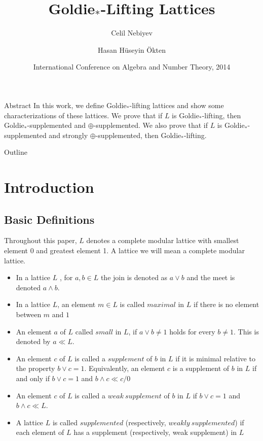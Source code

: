 \documentclass[handout]{beamer}
\title{Goldie${}_*$-Lifting Lattices}
\author{Celil Nebiyev\inst{1} \and Hasan Hüseyin Ökten\inst{2}}
\institute[Ondokuz] %
{
  \inst{1}%
  Department of Elementary Education, Education Faculty \\
  Ondokuz Mayıs University \and
  \inst{2}%
  Computer Programming Program, Technical Sciences Vocational School \\
  Amasya University}
\date{International Conference on Algebra and Number Theory, 2014}
\begin{document}
\begin{frame}
  \titlepage
\end{frame}
\begin{frame}{Abstract}
In this work, we define Goldie${}_*$-lifting lattices and show some characterizations of these lattices. 
We prove that if $ L $ is Goldie${}_* $-lifting, then Goldie$ {}_* $-supplemented and $ \oplus $-supplemented. 
We also prove that if $ L $ is Goldie${}_* $-supplemented and strongly $ \oplus $-supplemented, then Goldie${}_* $-lifting.\\

\end{frame}

\begin{frame}{Outline}
  \tableofcontents
\end{frame}

\section{Introduction}
\subsection{Basic Definitions}

\begin{frame}
Throughout this paper, $ L $ denotes a complete modular lattice with smallest element 0 and 
greatest element 1. A lattice we will mean a complete modular lattice.
\end{frame}


\begin{frame}
\begin{itemize}[<+->]
    \item
        In a lattice $ L $ , for $ a,b \in L $ the join is denoted as $ a \vee b $ and the meet is denoted $ a \wedge b $.
    \item
        In a lattice $ L $, an element $ m \in L $ is called $
        maximal $ in $ L $ if there is no element between $ m $ and
        $ 1 $
    \item
        An element $ a $ of $ L $
        called $ small $ in $ L $, if $ a \vee b \neq 1 $ holds for
        every $ b \neq 1 $. This is denoted by $ a \ll L $. 
    \item
        An element $ c $ of $ L $ is called a $ supplement $ of $ b
        $ in $ L $ 
        if it is minimal relative to the property $ b \vee c = 1 $.
        Equivalently, an element $ c $ is a supplement of $ b $ in $
        L $ if and only if $ b \vee c = 1 $ and 
        $ b \wedge c \ll c/0 $
    \item
        An element $ c $ of $ L $ is called a $ weak \ supplement $
        of $ b $ in $ L $ if $ b \vee c = 1 $ and $ b \wedge c \ll L
        $. 
    \item
        A lattice $ L $ is called 
        $ supplemented $ (respectively, $ weakly \ supplemented $)
        if each element of $ L $ has a supplement (respectively,
        weak supplement) in $ L $
\end{itemize}
\end{frame}
\end{document}
